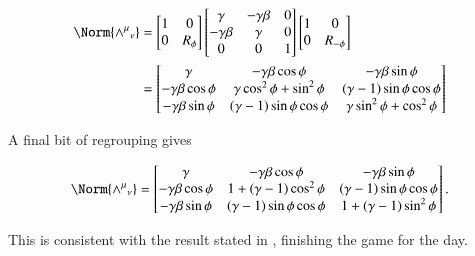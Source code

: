 \begin{align*}
\Norm{{\wedge^\mu}_\nu} &=
\begin{bmatrix}
1 & 0 \\
0 & R_{\phi}
\end{bmatrix}
\begin{bmatrix}
\gamma & -\gamma \beta & 0 \\
-\gamma \beta & \gamma & 0 \\
0 & 0 & 1
\end{bmatrix}
\begin{bmatrix}
1 & 0 \\
0 & R_{-\phi}
\end{bmatrix} \\
&=
\begin{bmatrix}
\gamma & - \gamma \beta \cos\phi & -\gamma \beta \sin\phi \\
-\gamma \beta \cos\phi & \gamma \cos^2\phi + \sin^2 \phi & (\gamma -1) \sin\phi \cos\phi \\
-\gamma \beta \sin\phi & (\gamma -1) \sin\phi \cos\phi & \gamma \sin^2\phi + \cos^2\phi \\
\end{bmatrix} \\
\end{align*}

A final bit of regrouping gives

\begin{equation}\label{eqn:complexPlanarBoost:250}
\Norm{{\wedge^\mu}_\nu} 
=
\begin{bmatrix}
\gamma & - \gamma \beta \cos\phi & -\gamma \beta \sin\phi \\
-\gamma \beta \cos\phi & 1 + ( \gamma -1) \cos^2\phi & (\gamma -1) \sin\phi \cos\phi \\
-\gamma \beta \sin\phi & (\gamma -1) \sin\phi \cos\phi & 1 + (\gamma -1) \sin^2\phi \\
\end{bmatrix}.
\end{equation}

This is consistent with the result stated in \cite{wiki:LorentzBoost}, finishing the game for the day.

\EndArticle
